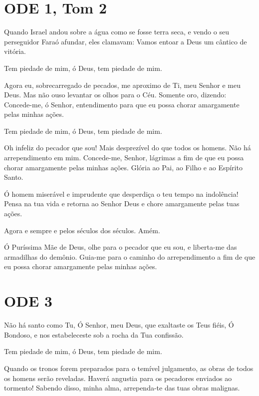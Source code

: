 \documentclass{subfiles}
\begin{document}
\pagestyle{empty}
{\centering}
\pagestyle{headings}

\section*{ODE 1, Tom 2}

\eirmos{}Quando Israel andou sobre a água como se fosse terra seca, e vendo o seu
perseguidor Faraó afundar, eles clamavam: Vamos entoar a Deus um cântico de
vitória.

Tem piedade de mim, ó Deus, tem piedade de mim.

Agora eu, sobrecarregado de pecados, me aproximo de Ti, meu Senhor e meu Deus.
Mas não ouso levantar os olhos para o Céu. Somente oro, dizendo: Concede-me, ó
Senhor, entendimento para que eu possa chorar amargamente pelas minhas ações.

Tem piedade de mim, ó Deus, tem piedade de mim.

Oh infeliz do pecador que sou! Mais desprezível do que todos os homens. Não há
arrependimento em mim. Concede-me, Senhor, lágrimas a fim de que eu possa chorar
amargamente pelas minhas ações. Glória ao Pai, ao Filho e ao Espírito Santo.

Ó homem miserável e imprudente que desperdiça o teu tempo na
indolência! Pensa na tua vida e retorna ao Senhor Deus e chore amargamente
pelas tuas ações.

Agora e sempre e pelos séculos dos séculos. Amém.

\theotokion{}Ó Puríssima Mãe de Deus, olhe para o pecador que eu sou, e
liberta-me das armadilhas do demônio. Guia-me para o caminho do arrependimento a
fim de que eu possa chorar amargamente pelas minhas ações.

\section*{ODE 3}

\eirmos{}Não há santo como Tu, Ó Senhor, meu Deus, que exaltaste os Teus fiéis,
Ó Bondoso, e nos estabeleceste sob a rocha da Tua confissão.

Tem piedade de mim, ó Deus, tem piedade de mim.

Quando os tronos forem preparados para o temível julgamento, as obras de todos
os homens serão reveladas. Haverá angustia para os pecadores enviados ao
tormento! Sabendo disso, minha alma, arrependa-te das tuas obras malignas.
\end{document}
